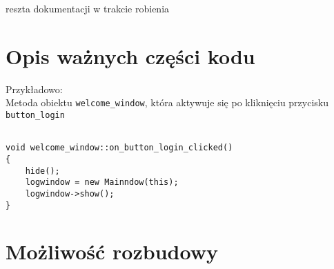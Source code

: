 \documentclass{article}
\begin{document}
\huge{reszta dokumentacji w trakcie robienia}


\section{Opis ważnych części kodu}
 
Przykładowo: \\

Metoda obiektu \verb|welcome_window|, która aktywuje się po kliknięciu przycisku \verb|button_login|
\\

\begin{tcolorbox}
\begin{lstlisting}

void welcome_window::on_button_login_clicked()
{
    hide();
    logwindow = new Mainndow(this);
    logwindow->show();
}

\end{lstlisting}
\end{tcolorbox}

\section{Możliwość rozbudowy}
\end{document}

